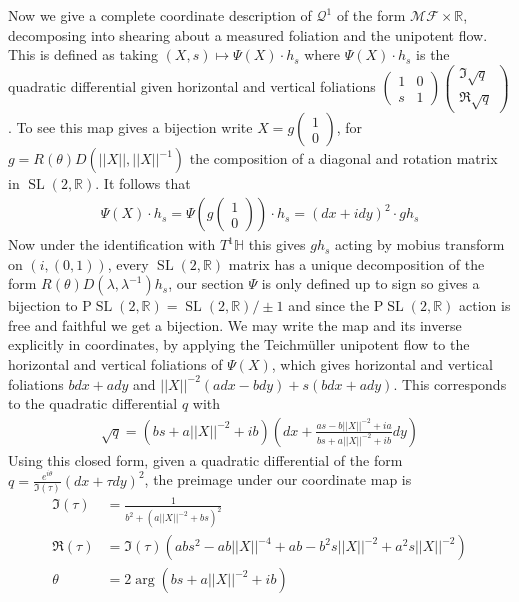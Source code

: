 \documentclass{article}
\newcommand{\norm}[1]{\lvert\lvert#1\rvert\rvert}
\newcommand{\slr}{\operatorname{SL}(2,\mathbb{R})}
\begin{document}
        Now we give a complete coordinate description of \(\mathcal{Q}^1\) of the form \(\mathscr{MF}\times \mathbb{R}\), decomposing into shearing about a measured foliation and the unipotent flow. This is defined as taking \((X,s) \mapsto \Psi(X)\cdot h_s\) where \(\Psi(X)\cdot h_s\) is the quadratic differential given horizontal and vertical foliations \(\begin{pmatrix} 1 & 0 \\ s & 1 \end{pmatrix}\begin{pmatrix} \Im\sqrt{q} \\ \Re\sqrt{q} \end{pmatrix}\). To see this map gives a bijection write \(X = g\begin{pmatrix} 1 \\ 0 \end{pmatrix}\), for \(g = R(\theta)D(\norm{X},\norm{X}^{-1})\) the composition of a diagonal and rotation matrix in \(\slr\). It follows that
        \begin{align*}
            \Psi(X)\cdot h_s = \Psi\left(g \begin{pmatrix} 1 \\ 0 \end{pmatrix}\right)\cdot h_s = (dx + idy)^2\cdot gh_s
        \end{align*}
        Now under the identification with \(T^1 \mathbb{H}\) this gives \(gh_s\) acting by mobius transform on \((i,(0,1))\), every \(\slr\) matrix has a unique decomposition of the form \(R(\theta)D(\lambda,\lambda^{-1})h_s\), our section \(\Psi\) is only defined up to sign so gives a bijection to \(\text{P}\slr = \slr/\pm1\) and since the \(\text{P}\slr\) action is free and faithful we get a bijection. We may write the map and its inverse explicitly in coordinates, by applying the Teichm\"uller unipotent flow to the horizontal and vertical foliations of \(\Psi(X)\), which gives horizontal and vertical foliations \(bdx + ady\) and \(\norm{X}^{-2}(adx - bdy) + s(bdx + ady)\). This corresponds to the quadratic differential \(q\) with
        \begin{align*}
            \sqrt{q} = (bs + a\norm{X}^{-2} + ib)\left(dx + \frac{as-b\norm{X}^{-2}+ia}{bs + a\norm{X}^{-2} + ib}dy\right)
        \end{align*}
        Using this closed form, given a quadratic differential of the form \(q = \frac{e^{i\theta}}{\Im (\tau)}(dx + \tau dy)^2\), the preimage under our coordinate map is
        \begin{align*}
            \Im (\tau) &= \frac{1}{b^2 + (a\norm{X}^{-2}+bs)^2} \\
            \Re (\tau) &= \Im(\tau)(abs^2-ab\norm{X}^{-4} + ab - b^2s\norm{X}^{-2} + a^2s\norm{X}^{-2}) \\
            \theta &= 2\arg(bs + a\norm{X}^{-2} + ib)
        \end{align*}
\end{document}
